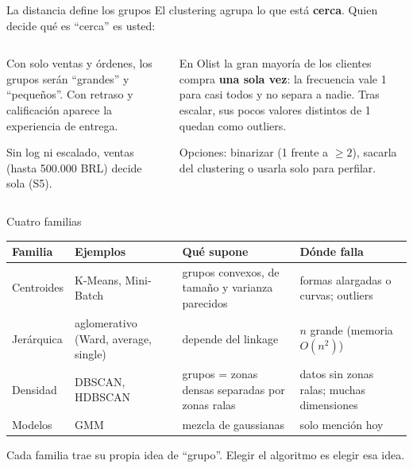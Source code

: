 \documentclass[aspectratio=169,12pt]{beamer}
\newcommand{\hrow}{\rowcolor{mlcream}}
\begin{document}
\begin{frame}{La distancia define los grupos}
  \small El clustering agrupa lo que está \textbf{cerca}. Quien decide qué es ``cerca'' es usted:
  \begin{columns}[T]
    \begin{column}{0.48\textwidth}
      \begin{goldbox}
        \footnotesize Con solo ventas y órdenes, los grupos serán ``grandes'' y ``pequeños''. Con retraso y calificación aparece la experiencia de entrega.
      \end{goldbox}
      \begin{goldbox}
        \footnotesize Sin log ni escalado, ventas (hasta 500.000 BRL) decide sola (S5).
      \end{goldbox}
    \end{column}
    \begin{column}{0.48\textwidth}
      \begin{rulebox}
        \footnotesize En Olist la gran mayoría de los clientes compra \textbf{una sola vez}: la frecuencia vale 1 para casi todos y no separa a nadie. Tras escalar, sus pocos valores distintos de 1 quedan como outliers.
      \end{rulebox}
      \begin{keybox}
        \footnotesize Opciones: binarizar (1 frente a $\geq 2$), sacarla del clustering o usarla solo para perfilar.
      \end{keybox}
    \end{column}
  \end{columns}
\end{frame}

\begin{frame}{Cuatro familias}
  \centering\footnotesize
  \begin{tabular}{@{}L{0.17\textwidth} L{0.2\textwidth} L{0.26\textwidth} L{0.27\textwidth}@{}}
    \toprule
    \hrow \textbf{Familia} & \textbf{Ejemplos} & \textbf{Qué supone} & \textbf{Dónde falla} \\
    \midrule
    Centroides & K-Means, Mini-Batch & grupos convexos, de tamaño y varianza parecidos & formas alargadas o curvas; outliers \\
    Jerárquica & aglomerativo (Ward, average, single) & depende del linkage & $n$ grande (memoria $O(n^2)$) \\
    Densidad & DBSCAN, HDBSCAN & grupos = zonas densas separadas por zonas ralas & datos sin zonas ralas; muchas dimensiones \\
    Modelos & GMM & mezcla de gaussianas & solo mención hoy \\
    \bottomrule
  \end{tabular}
  \raggedright
  \begin{keybox}
    \small Cada familia trae su propia idea de ``grupo''. Elegir el algoritmo es elegir esa idea.
  \end{keybox}
\end{frame}
\end{document}
